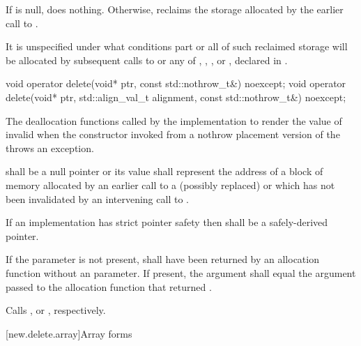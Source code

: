 \begin{itemdescr}
\pnum
{}
If  is null, does nothing. Otherwise, reclaims the
storage allocated by the earlier call to .

\pnum
\remarks
It is unspecified under what conditions part or all of such
%
reclaimed storage will be allocated by subsequent
calls to
or any of
,
,
,
or
,
declared in
.
\end{itemdescr}

%
\begin{itemdecl}
void operator delete(void* ptr, const std::nothrow_t&) noexcept;
void operator delete(void* ptr, std::align_val_t alignment, const std::nothrow_t&) noexcept;
\end{itemdecl}

\begin{itemdescr}
\pnum
\effects
The
deallocation functions
called by the implementation
to render the value of  invalid
when the constructor invoked from a nothrow
placement version of the  throws an exception.

\pnum
\replaceable
{}

\pnum
\requires
{} shall be a null pointer or
its value shall represent the address of
a block of memory allocated by
an earlier call to a (possibly replaced)
or
which has not been invalidated by an intervening call to
.

\pnum
\requires
If an implementation has strict pointer safety
then  shall be a safely-derived pointer.

\pnum
\requires
If the  parameter is not present,
 shall have been returned by an allocation function
without an  parameter.
If present, the  argument
shall equal the  argument
passed to the allocation function that returned .

\pnum
{}
Calls ,
or ,
respectively.
\end{itemdescr}

[new.delete.array]{Array forms}


